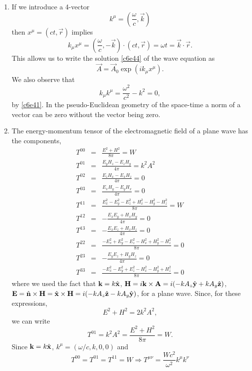 \begin{enumerate}
\item If we introduce a 4-vector
\begin{equation}\label{c6e54}
k^\mu = \left(\frac{\omega}{c}, \vec{k}\right)
\end{equation}
then $x^\mu = (ct, \vec{r})$ implies
\begin{equation}\label{c6e55}
k_\mu x^\mu = \left(\frac{\omega}{c}, -\vec{k}\right)\cdot(ct, \vec{r})
= \omega t =\vec{k}\cdot\vec{r}.
\end{equation}
This allows us to write the solution \eqref{c6e44} of the wave equation as 
\begin{equation}\label{c6e56}
\vec{A} = \vec{A}_0\exp(ik_\mu x^\mu).
\end{equation}
We also observe that
\begin{equation}\label{c6e57}
k_\mu k^\mu = \frac{\omega^2}{c^2} - k^2 = 0,
\end{equation}
by \eqref{c6e41}. In the pseudo-Euclidean geometry of the space-time a norm of a
vector can be zero without the vector being zero.

\item The energy-momentum tensor of the electromagnetic field of a plane wave has
the components,
\begin{eqnarray*}
T^{00} &=& \frac{E^2 + H^2}{8\pi} = W \\
T^{01} &=& \frac{E_yH_z - E_zH_y}{4\pi} = k^2A^2\\
T^{02} &=& \frac{E_zH_x - E_xH_z}{4\pi} = 0 \\
T^{03} &=& \frac{E_xH_y - E_yH_x}{4\pi} = 0 \\
T^{11} &=& \frac{E_x^2 - E_y^2 - E_z^2 + H_x^2 - H_y^2 - H_z^2}{8\pi} = W \\
T^{12} &=& -\frac{E_xE_y + H_xH_y}{4\pi} = 0\\
T^{13} &=& -\frac{E_xE_z + H_xH_z}{4\pi} = 0\\
T^{22} &=& \frac{-E_x^2 + E_y^2 - E_z^2 - H_x^2 + H_y^2 - H_z^2}{8\pi} = 0\\
T^{23} &=& -\frac{E_yE_z + H_yH_z}{4\pi} = 0 \\
T^{33} &=& \frac{-E_x^2 - E_y^2 + E_z^2 - H_x^2 - H_y^2 + H_z^2}{8\pi} = 0
\end{eqnarray*}
where we used the fact that $\mathbf{k} = k\hat{\mathbf{x}}$, $\mathbf{H} = i\mathbf{k}\times\mathbf{A}
= i(-kA_z\hat{\mathbf{y}} + kA_y\hat{\mathbf{z}})$, $\mathbf{E} = \hat{\mathbf{n}}\times\mathbf{H} = \hat{\mathbf{x}}\times\mathbf{H}
= i(-kA_z\hat{\mathbf{z}} - kA_y\hat{\mathbf{y}})$, for a plane wave. Since, for these expressions,
\[
E^2 + H^2 = 2k^2A^2,
\]
we can write
\begin{equation}\label{c6e58}
T^{01} = k^2A^2 = \frac{E^2 + H^2}{8\pi} = W.
\end{equation}
Since $\mathbf{k} = k\hat{\mathbf{x}}$, $k^\mu = (\omega/c, k, 0, 0)$ and
\begin{equation}\label{c6e59}
T^{00} = T^{01} = T^{11} = W \Rightarrow T^{\mu\nu} = 
\frac{Wc^2}{\omega^2}k^\mu k^\nu
\end{equation}
\end{enumerate}